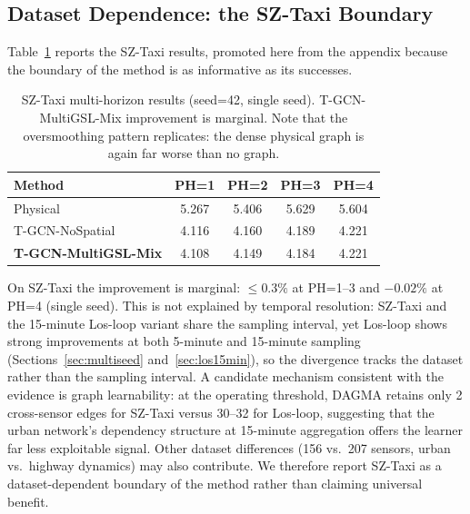 \subsection{Dataset Dependence: the SZ-Taxi Boundary}\label{sec:sz_boundary}

Table~\ref{tab:sz_multiph} reports the SZ-Taxi results, promoted here from the appendix because the boundary of the method is as informative as its successes.

\begin{table}[t]
\centering
\caption{SZ-Taxi multi-horizon results (seed=42, single seed). T-GCN-MultiGSL-Mix improvement is marginal. Note that the oversmoothing pattern replicates: the dense physical graph is again far worse than no graph.}
\label{tab:sz_multiph}
\begin{tabular}{lcccc}
\toprule
\textbf{Method} & \textbf{PH=1} & \textbf{PH=2} & \textbf{PH=3} & \textbf{PH=4} \\
\midrule
Physical & 5.267 & 5.406 & 5.629 & 5.604 \\
T-GCN-NoSpatial & 4.116 & 4.160 & 4.189 & 4.221 \\
\textbf{T-GCN-MultiGSL-Mix} & 4.108 & 4.149 & 4.184 & 4.221 \\
\bottomrule
\end{tabular}
\end{table}

On SZ-Taxi the improvement is marginal: $\leq0.3\%$ at PH=1--3 and $-0.02\%$ at PH=4 (single seed). This is not explained by temporal resolution: SZ-Taxi and the 15-minute Los-loop variant share the sampling interval, yet Los-loop shows strong improvements at both 5-minute and 15-minute sampling (Sections~\ref{sec:multiseed} and~\ref{sec:los15min}), so the divergence tracks the dataset rather than the sampling interval. A candidate mechanism consistent with the evidence is graph learnability: at the operating threshold, DAGMA retains only 2 cross-sensor edges for SZ-Taxi versus 30--32 for Los-loop, suggesting that the urban network's dependency structure at 15-minute aggregation offers the learner far less exploitable signal. Other dataset differences (156 vs.\ 207 sensors, urban vs.\ highway dynamics) may also contribute. We therefore report SZ-Taxi as a dataset-dependent boundary of the method rather than claiming universal benefit.
